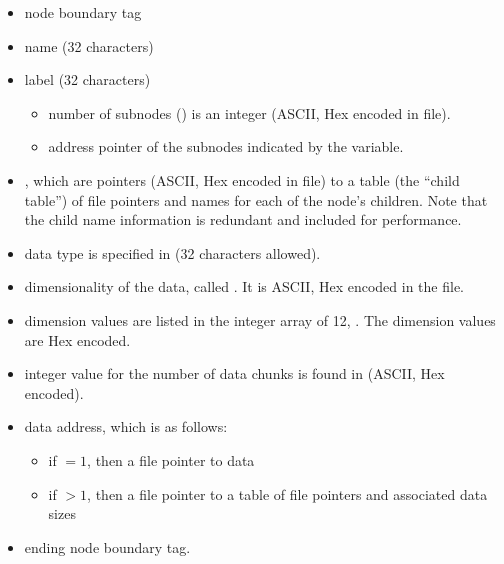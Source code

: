 \begin{itemize}
\item node boundary tag
\item name (32 characters)
\item label (32 characters)
      \begin{itemize}
      \item number of subnodes () is an integer
            (ASCII, Hex encoded in file).
      \item address pointer of the subnodes indicated by the variable.
      \end{itemize}
\item {}, which are pointers (ASCII, Hex encoded in file)
      to a table (the ``child table'') of file pointers and names for each
      of the node's children.
      Note that the child name information is redundant and included for
      performance.
\item data type is specified in  (32 characters allowed).
\item dimensionality of the data, called .
      It is ASCII, Hex encoded in the file.
\item dimension values are listed in the integer array of 12,
      .
      The dimension values are Hex encoded.
\item integer value for the number of data chunks is found in
       (ASCII, Hex encoded).
\item data address, which is as follows:
      \begin{itemize}
      \item if  $= 1$, then a file pointer to data
      \item if  $> 1$, then a file pointer to
            a table of  file pointers and
            associated data sizes
      \end{itemize}
%
\item ending node boundary tag.
\end{itemize}

